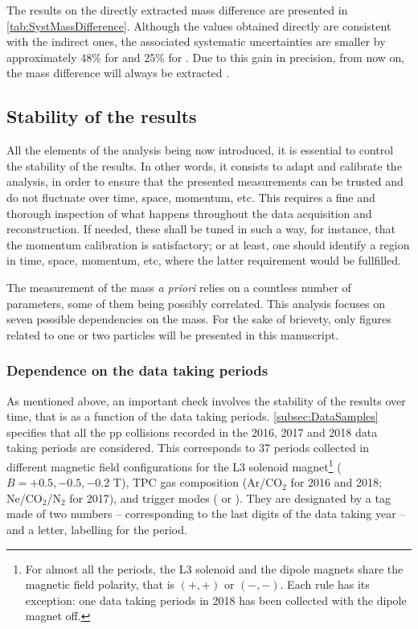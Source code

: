 The results on the directly extracted mass difference are presented in \tab\ref{tab:SystMassDifference}. Although the values obtained directly are consistent with the indirect ones, the associated systematic uncertainties are smaller by approximately 48\% for \rmXi and 25\% for \rmOmega. Due to this gain in precision, from now on, the mass difference will always be extracted .

\subsection{Stability of the results}
\label{subsec:StabilityResults}

All the elements of the analysis being now introduced, it is essential to control the stability of the results. In other words, it consists to adapt and calibrate the analysis, in order to ensure that the presented measurements can be trusted and do not fluctuate over time, space, momentum, etc. This requires a fine and thorough inspection of what happens throughout the data acquisition and reconstruction. If needed, these shall be tuned in such a way, for instance, that the momentum calibration is satisfactory; or at least, one should identify a region in time, space, momentum, etc, where the latter requirement would be fullfilled.

The measurement of the mass \textit{a priori} relies on a countless number of parameters, some of them being possibly correlated. This analysis focuses on seven possible dependencies on the mass. For the sake of brievety, only figures related to one or two particles will be presented in this manuscript.

\subsubsection{Dependence on the data taking periods}
\label{subsubsec:DataTakingDependence}

As mentioned above, an important check involves the stability of the results over time, that is as a function of the data taking periods. \Sec\ref{subsec:DataSamples} specifies that all the pp collisions recorded in the 2016, 2017 and 2018 data taking periods are considered. This corresponds to 37 periods collected in different magnetic field configurations for the L3 solenoid magnet\footnote{For almost all the periods, the L3 solenoid and the dipole magnets share the magnetic field polarity, that is $(+,+)$ or $(-,-)$. Each rule has its exception: one data taking periods in 2018 has been collected with the dipole magnet off.} ($B = + 0.5, -0.5, -0.2$ T), TPC gas composition (Ar/CO$_{2}$ for 2016 and 2018; Ne/CO$_{2}$/N$_{2}$ for 2017), and trigger modes ( or ). They are designated by a tag made of two numbers -- corresponding to the last digits of the data taking year -- and a letter, labelling for the period.

